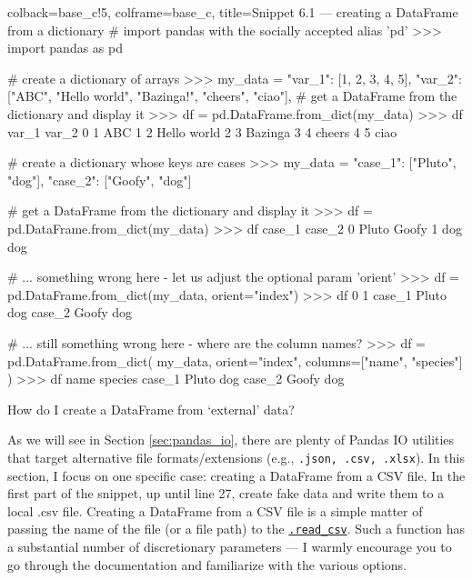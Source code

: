 \documentclass[a4paper,11pt]{book}
\newcommand{\question}[1]{%
    \begin{tcolorbox}[colback=comp_c!10,colframe=comp_c,sidebyside align=top,width=\linewidth,before skip=1ex]
        #1
    \end{tcolorbox}
    \switchcolumn%
}
\newcommand{\note}[1]{%
    \begin{tcolorbox}[colback=white!0,colframe=white!10,width=\linewidth,before skip=1ex]
        #1
    \end{tcolorbox}
}
\begin{document}
\begin{pythoncode}[linenos=true,]{colback=base_c!5, colframe=base_c, title=\sffamily Snippet 6.1 --- creating a DataFrame from a dictionary}
# import pandas with the socially accepted alias 'pd'
>>> import pandas as pd

# create a dictionary of arrays
>>> my_data = {
        "var_1": [1, 2, 3, 4, 5],
        "var_2": ["ABC", "Hello world", "Bazinga!", "cheers", "ciao"],
    }
# get a DataFrame from the dictionary and display it
>>> df = pd.DataFrame.from_dict(my_data)
>>> df
   var_1        var_2
0      1          ABC
1      2  Hello world
2      3      Bazinga
3      4       cheers
4      5         ciao

# create a dictionary whose keys are cases 
>>> my_data = {"case_1": ["Pluto", "dog"], "case_2": ["Goofy", "dog"]}


# get a DataFrame from the dictionary and display it
>>> df = pd.DataFrame.from_dict(my_data)
>>> df
   case_1   case_2
0   Pluto    Goofy
1     dog      dog

# ... something wrong here - let us adjust the optional param 'orient'
>>> df = pd.DataFrame.from_dict(my_data, orient="index")
>>> df
            0       1
case_1  Pluto     dog
case_2  Goofy     dog

# ... still something wrong here - where are the column names?
>>> df = pd.DataFrame.from_dict(
	my_data, orient="index",
	columns=["name", "species"]
	)
>>> df
         name  species
case_1  Pluto      dog
case_2  Goofy      dog

\end{pythoncode}

\begin{paracol}{2}
	\question{\raggedright How do I create a DataFrame from `external' data?}
	\note{As we will see in Section \ref{sec:pandas_io}, there are plenty of Pandas IO utilities that target alternative file formats/extensions (e.g., \texttt{.json, .csv, .xlsx}). In this section, I focus on one specific case: creating a DataFrame from a CSV file. In the first part of the snippet, up until line 27, create fake data and write them to a local .csv file. Creating a DataFrame from a CSV file is a simple matter of passing the name of the file (or a file path) to the \href{https://pandas.pydata.org/docs/reference/api/pandas.read_csv.html?highlight=read_csv#pandas.read_csv}{\texttt{.read\_csv}}. Such a function has a substantial number of discretionary parameters --- I warmly encourage you to go through the documentation and familiarize with the various options.}
\end{paracol}
\end{document}
